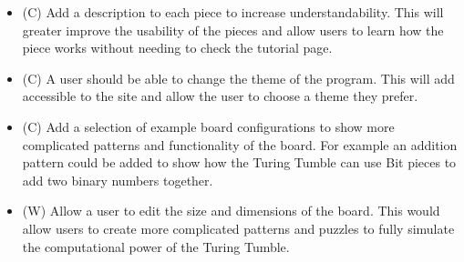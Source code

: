 \documentclass{l4proj}
\begin{document}
\begin{itemize}
    \item (C) Add a description to each piece to increase understandability. This will greater improve the usability of the pieces and allow users to learn how the piece works without needing to check the tutorial page.
    \item (C) A user should be able to change the theme of the program. This will add accessible to the site and allow the user to choose a theme they prefer.
    \item (C) Add a selection of example board configurations to show more complicated patterns and functionality of the board. For example an addition pattern could be added to show how the Turing Tumble can use Bit pieces to add two binary numbers together.
    \item (W) Allow a user to edit the size and dimensions of the board. This would allow users to create more complicated patterns and puzzles to fully simulate the computational power of the Turing Tumble.
\end{itemize}
\end{document}
